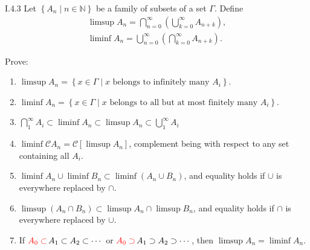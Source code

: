 \begin{problem}{I.4.3}
Let \( \left\{ A_{n} \mid n \in \mathbb{N} \right\} \) be a family of subsets of a set \( \Gamma \). Define
\[
	\begin{split}
		\limsup A_{n} = \bigcap^{\infty}_{n=0} \left(\bigcup^{\infty}_{k=0} A_{n+k}\right), \\
		\liminf A_{n} = \bigcup^{\infty}_{n=0} \left(\bigcap^{\infty}_{k=0} A_{n+k}\right).
	\end{split}
\]

Prove:
\begin{enumerate}[label={(\alph*)}]
	\item \( \limsup A_{n} = \left\{ x \in \Gamma \mid x \text{ belongs to infinitely many } A_{i} \right\} \).
	\item \( \liminf A_{n} = \left\{ x \in \Gamma \mid x \text{ belongs to all but at most finitely many } A_{i} \right\} \).
	\item \( \displaystyle \bigcap^{\infty}_{1} A_{i} \subset \liminf A_{n} \subset \limsup A_{n} \subset \bigcup^{\infty}_{1} A_{i} \)
	\item \( \liminf \mathscr{C}A_{n} = \mathscr{C}[\limsup A_{n}] \), complement being with respect to any set containing all \( A_{i} \).
	\item \( \liminf A_{n} \cup \liminf B_{n} \subset \liminf (A_{n} \cup B_{n}) \), and equality holds if \( \cup \) is everywhere replaced by \( \cap \).
	\item \( \limsup (A_{n}\cap B_{n}) \subset \limsup A_{n} \cap \limsup B_{n} \), and equality holds if \( \cap \) is everywhere replaced by \( \cup \).
	\item If \( {\color{red}A_{0} \subset\,} A_{1} \subset A_{2} \subset \cdots \) or \( {\color{red}A_{0} \supset\,} A_{1} \supset A_{2} \supset \cdots \), then \( \limsup A_{n} = \liminf A_{n} \).
\end{enumerate}
\end{problem}

